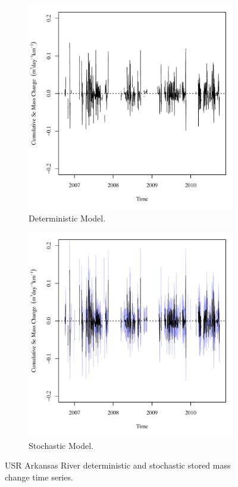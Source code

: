 \begin{linenumbers}
\begin{figure}[htbp]
\centering
	\begin{subfigure}{0.5\textwidth}
		\centering
		\includegraphics[width=0.9\linewidth]{"Figures/Results_DUSR/Balance Mass - Storage"}
		\caption{Deterministic Model.}
		\label{sub:USRMassStoreD}
	\end{subfigure}%
	\begin{subfigure}{0.5\textwidth}
		\centering
		\includegraphics[width=0.9\linewidth]{"Figures/Results_USR/Balance Mass - Storage"}
		\caption{Stochastic Model.}
		\label{sub:USRMassStoreS}
	\end{subfigure}
	\caption[USR Arkansas River deterministic and stochastic stored mass change time series.]{USR Arkansas River deterministic and stochastic stored mass change time series.}
	\label{fig:USRMassStore}
\end{figure}


\end{linenumbers}
